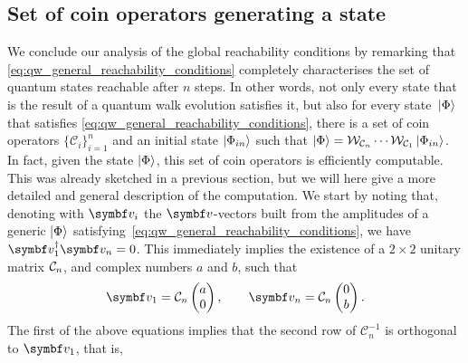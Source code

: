 \subsection{Set of coin operators generating a state}
\label{sec:coin_operators_generating_state}
We conclude our analysis of the global reachability conditions by remarking that \cref{eq:qw_general_reachability_conditions} completely characterises the set of quantum states reachable after $n$ steps.
In other words, not only every state that is the result of a quantum walk evolution satisfies it, but also for every state $\ket*{\Phi}$ that satisfies \cref{eq:qw_general_reachability_conditions}, there is a set of coin operators $\{ \mathcal C_i \}_{i=1}^n$ and an initial state $\ket{\Phi_{in}}$ such that
$\ket\Phi = 
	\mathcal W_{\mathcal C_n} \cdots \mathcal W_{\mathcal C_1}
	\ket{\Phi_{in}}$.
In fact, given the state $\ket\Phi$, this set of coin operators is efficiently computable.
This was already sketched in a previous section, but we will here give a more detailed and general description of the computation.
We start by noting that,
denoting with $\bs v_i$ the $\bs v$-vectors built from the amplitudes of a generic $\ket{\Phi}$ satisfying~\cref{eq:qw_general_reachability_conditions}, we have $\bs v_1^\dagger \bs v_n = 0$.
This immediately implies the existence of a $2\times2$ unitary matrix ${\mathcal{C}}_n$, and complex numbers $a$ and $b$, such that
\begin{equation}
	\bs v_1 = \mathcal C_n
	\begin{pmatrix} a \\ 0 \end{pmatrix},
	\qquad
	\bs v_n = \mathcal C_n
	\begin{pmatrix} 0 \\ b \end{pmatrix}.
	\label{eq:equations_giving_C}
\end{equation}
The first of the above equations implies that the second row of $\mathcal C_n^{-1}$ is orthogonal to $\bs v_1$, that is,
